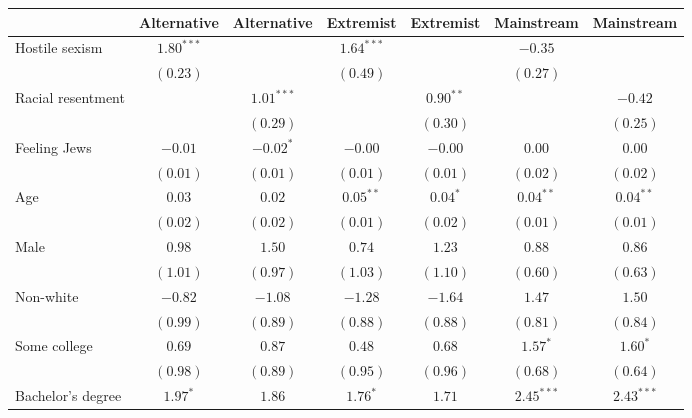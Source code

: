 
\usepackage{booktabs}

\begin{table}
\begin{center}
\begin{tabular}{l c c c c c c}
\toprule
 & Alternative & Alternative & Extremist & Extremist & Mainstream & Mainstream \\
\midrule
Hostile sexism    & $1.80^{***}$  &               & $1.64^{***}$ &              & $-0.35$       &               \\
                  & $(0.23)$      &               & $(0.49)$     &              & $(0.27)$      &               \\
Racial resentment &               & $1.01^{***}$  &              & $0.90^{**}$  &               & $-0.42$       \\
                  &               & $(0.29)$      &              & $(0.30)$     &               & $(0.25)$      \\
Feeling Jews      & $-0.01$       & $-0.02^{*}$   & $-0.00$      & $-0.00$      & $0.00$        & $0.00$        \\
                  & $(0.01)$      & $(0.01)$      & $(0.01)$     & $(0.01)$     & $(0.02)$      & $(0.02)$      \\
Age               & $0.03$        & $0.02$        & $0.05^{**}$  & $0.04^{*}$   & $0.04^{**}$   & $0.04^{**}$   \\
                  & $(0.02)$      & $(0.02)$      & $(0.01)$     & $(0.02)$     & $(0.01)$      & $(0.01)$      \\
Male              & $0.98$        & $1.50$        & $0.74$       & $1.23$       & $0.88$        & $0.86$        \\
                  & $(1.01)$      & $(0.97)$      & $(1.03)$     & $(1.10)$     & $(0.60)$      & $(0.63)$      \\
Non-white         & $-0.82$       & $-1.08$       & $-1.28$      & $-1.64$      & $1.47$        & $1.50$        \\
                  & $(0.99)$      & $(0.89)$      & $(0.88)$     & $(0.88)$     & $(0.81)$      & $(0.84)$      \\
Some college      & $0.69$        & $0.87$        & $0.48$       & $0.68$       & $1.57^{*}$    & $1.60^{*}$    \\
                  & $(0.98)$      & $(0.89)$      & $(0.95)$     & $(0.96)$     & $(0.68)$      & $(0.64)$      \\
Bachelor's degree & $1.97^{*}$    & $1.86$        & $1.76^{*}$   & $1.71$       & $2.45^{***}$  & $2.43^{***}$  \\

\end{tabular}
\end{center}
\end{table}
